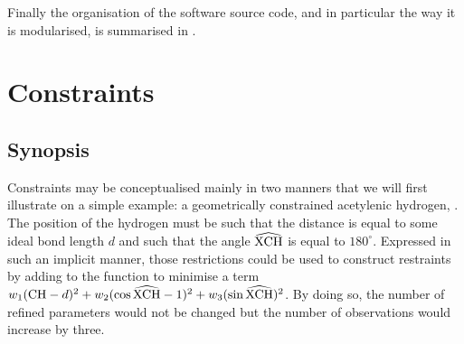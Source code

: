 \documentclass[pdf]{iucr}
\begin{document}
Finally the organisation of the software source code, and in particular the way it is modularised, is summarised in . 

\section{Constraints}
\label{sec:constraints}

\subsection{Synopsis}

Constraints may be conceptualised mainly in two manners that we will first illustrate on a simple example: a geometrically constrained acetylenic hydrogen, . The position of the hydrogen must be such that the distance  is equal to some ideal bond length $d$ and such that the angle $\widehat{\ce{XCH}}$ is equal to $180^\circ$. Expressed in such an implicit manner, those restrictions could be used to construct restraints by adding to the function to minimise a term $w_1 (\ce{CH} - d)^2 + w_2 (\cos \widehat{\ce{XCH}} - 1)^2 + w_3 (\sin  \widehat{\ce{XCH}})^2$. By doing so, the number of refined parameters would not be changed but the number of observations would increase by three. 
\end{document}
